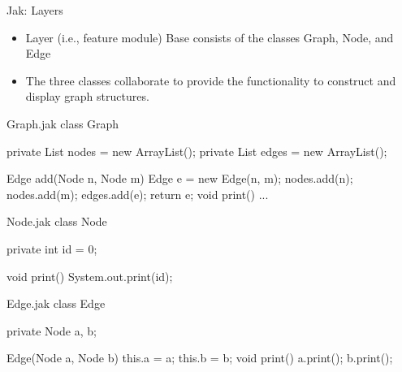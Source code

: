 \begin{frame}[fragile]{Jak: Layers}
	\begin{fancycolumns}[widths={60},animation=none]
		\begin{example}{}
			\begin{itemize}
				\item Layer (i.e., feature module) Base consists of the classes Graph, Node, and Edge 
				\item The three classes collaborate to provide the functionality to construct and display graph structures.
			\end{itemize}
		\end{example}
	\nextcolumn
	\end{fancycolumns}
	\begin{fancycolumns}[t,columns=3,widths={43,27},animation=none]
\begin{codetight}{Graph.jak}
class Graph {
	private List nodes = new ArrayList();
	private List edges = new ArrayList();
	
	Edge add(Node n, Node m) {
		Edge e = new Edge(n, m);
		nodes.add(n); nodes.add(m); edges.add(e);
		return e;
	}
	void print() { ... }
}
\end{codetight}		
	\nextcolumn
\begin{codetight}{Node.jak}
class Node {
	private int id = 0;

	void print() {
		System.out.print(id);
	}
}
\end{codetight}
	\nextcolumn
\begin{codetight}{Edge.jak}
class Edge {
	private Node a, b;
	
	Edge(Node a, Node b) {
		this.a = a; this.b = b;
	}
	void print() {
		a.print(); b.print();
	}
}
\end{codetight}			
	\end{fancycolumns}
\end{frame}

